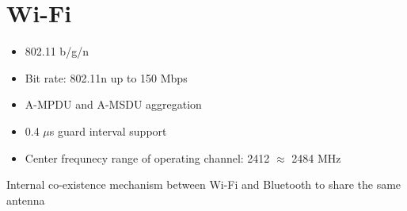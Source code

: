%
%
%

\chapter{Wi-Fi}

\cite{Espressif:2024}

\begin{itemize}
    \item 802.11 b/g/n
    \item Bit rate: 802.11n up to 150 Mbps
    \item A-MPDU and A-MSDU aggregation
    \item 0.4 $\mu$s guard interval support
    \item Center frequnecy range of operating channel: 2412 $\approx$ 2484 MHz
\end{itemize}

Internal co-existence mechanism between Wi-Fi and Bluetooth to share the same antenna



